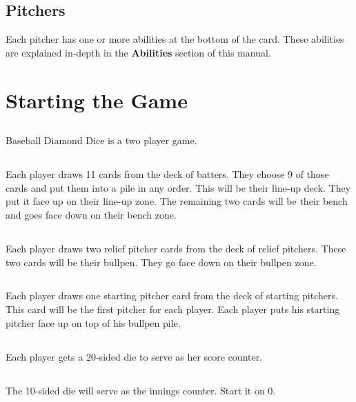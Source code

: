 \documentclass[12pt]{article} %
\begin{document}
\subsection{Pitchers}

Each pitcher has one or more abilities at the bottom of the card.  These abilities are explained in-depth in the \textbf{Abilities} section of this manual.  

\section{Starting the Game}

\subsection{}
Baseball Diamond Dice is a two player game.

\subsection{}
Each player draws 11 cards from the deck of batters.  They choose 9 of those cards and put them into a pile in any order.  This will be their line-up deck.  They put it face up on their line-up zone.  The remaining two cards will be their bench and goes face down on their bench zone.

\subsection{}
Each player draws two relief pitcher cards from the deck of relief pitchers.  These two cards will be their bullpen.  They go face down on their bullpen zone.

\subsection{}
Each player draws one starting pitcher card from the deck of starting pitchers.  This card will be the first pitcher for each player.  Each player puts his starting pitcher face up on top of his bullpen pile.

\subsection{}
Each player gets a 20-sided die to serve as her score counter.

\subsection{}
The 10-sided die will serve as the innings counter.  Start it on 0.
\end{document}
